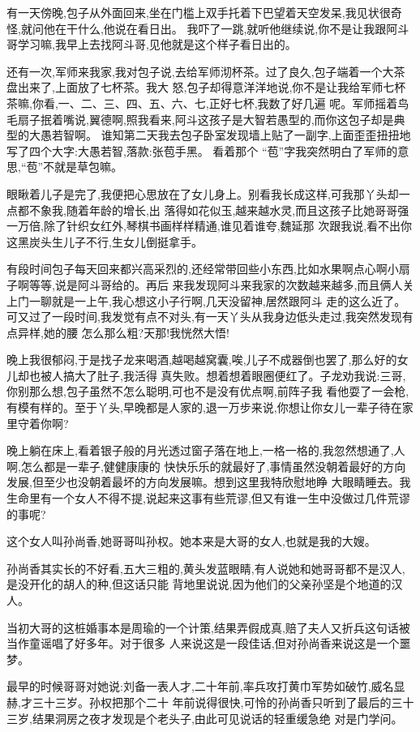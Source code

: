 ﻿\documentclass[12pt,twocolumn]{article}
\begin{document}
有一天傍晚,包子从外面回来,坐在门槛上双手托着下巴望着天空发呆,我见状很奇怪,就问他在干什么,他说在看日出。
我吓了一跳,就听他继续说,你不是让我跟阿斗哥学习嘛,我早上去找阿斗哥,见他就是这个样子看日出的。

还有一次,军师来我家,我对包子说,去给军师沏杯茶。过了良久,包子端着一个大茶盘出来了,上面放了七杯茶。我大
怒,包子却得意洋洋地说,你不是让我给军师七杯茶嘛,你看,一、二、三、四、五、六、七,正好七杯,我数了好几遍
呢。军师摇着鸟毛扇子抿着嘴说,翼德啊,照我看来,阿斗这孩子是大智若愚型的,而你这包子却是典型的大愚若智啊。
谁知第二天我去包子卧室发现墙上贴了一副字,上面歪歪扭扭地写了四个大字:大愚若智,落款:张苞手黑。 看着那个
``苞''字我突然明白了军师的意思,``苞''不就是草包嘛。

眼瞅着儿子是完了,我便把心思放在了女儿身上。别看我长成这样,可我那丫头却一点都不象我,随着年龄的增长,出
落得如花似玉,越来越水灵,而且这孩子比她哥哥强一万倍,除了针织女红外,琴棋书画样样精通,谁见着谁夸,魏延那
次跟我说,看不出你这黑炭头生儿子不行,生女儿倒挺拿手。

有段时间包子每天回来都兴高采烈的,还经常带回些小东西,比如水果啊点心啊小扇子啊等等,说是阿斗哥给的。再后
来我发现阿斗来我家的次数越来越多,而且俩人关上门一聊就是一上午,我心想这小子行啊,几天没留神,居然跟阿斗
走的这么近了。可又过了一段时间,我发觉有点不对头,有一天丫头从我身边低头走过,我突然发现有点异样,她的腰
怎么那么粗?天那!我恍然大悟!

晚上我很郁闷,于是找子龙来喝酒,越喝越窝囊,唉,儿子不成器倒也罢了,那么好的女儿却也被人搞大了肚子,我活得
真失败。想着想着眼圈便红了。子龙劝我说:三哥,你别那么想,包子虽然不怎么聪明,可也不是没有优点啊,前阵子我
看他耍了一会枪,有模有样的。至于丫头,早晚都是人家的,退一万步来说,你想让你女儿一辈子待在家里守着你啊?

晚上躺在床上,看着银子般的月光透过窗子落在地上,一格一格的,我忽然想通了,人啊,怎么都是一辈子,健健康康的
快快乐乐的就最好了,事情虽然没朝着最好的方向发展,但至少也没朝着最坏的方向发展嘛。想到这里我特欣慰地睁
大眼睛睡去。我生命里有一个女人不得不提,说起来这事有些荒谬,但又有谁一生中没做过几件荒谬的事呢?

这个女人叫孙尚香,她哥哥叫孙权。她本来是大哥的女人,也就是我的大嫂。

孙尚香其实长的不好看,五大三粗的,黄头发蓝眼睛,有人说她和她哥哥都不是汉人,是没开化的胡人的种,但这话只能
背地里说说,因为他们的父亲孙坚是个地道的汉人。

当初大哥的这桩婚事本是周瑜的一个计策,结果弄假成真,赔了夫人又折兵这句话被当作童谣唱了好多年。对于很多
人来说这是一段佳话,但对孙尚香来说这是一个噩梦。

最早的时候哥哥对她说:刘备一表人才,二十年前,率兵攻打黄巾军势如破竹,威名显赫,才三十三岁。孙权把那个二十
年前说得很快,可怜的孙尚香只听到了最后的三十三岁,结果洞房之夜才发现是个老头子,由此可见说话的轻重缓急绝
对是门学问。
\end{document}
